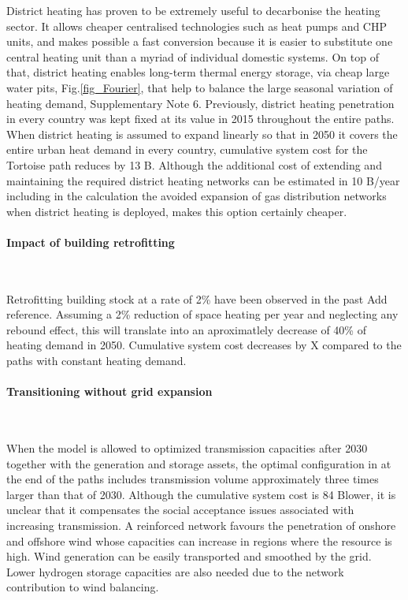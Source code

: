 \documentclass[5p]{elsarticle} %
\begin{document}
District heating has proven to be extremely useful to decarbonise the heating sector. It allows cheaper centralised technologies such as heat pumps and CHP units, and makes possible a fast conversion because it is easier to substitute one central heating unit than a myriad of individual domestic systems. On top of that, district heating enables long-term thermal energy storage, via cheap large water pits, Fig.\ref{fig_Fourier}, that help to balance the large seasonal variation of heating demand, Supplementary Note 6. Previously, district heating penetration in every country was kept fixed at its value in 2015 \cite{DH_penetration} throughout the entire paths. When district heating is assumed to expand linearly so that in 2050 it covers the entire urban heat demand in every country, cumulative system cost for the Tortoise path reduces by 13 B\EUR. Although the additional cost of extending and maintaining the required district heating networks can be estimated in 10 B\EUR/year \cite{Brown_2018} including in the calculation the avoided expansion of gas distribution networks when district heating is deployed, makes this option certainly cheaper. 

\paragraph{\textbf{Impact of building retrofitting}} \

Retrofitting building stock at a rate of 2\% have been observed in the past \textcolor[rgb]{1,0,0}{Add reference}. Assuming a 2\% reduction of space heating per year and neglecting any rebound effect, this will translate into an aproximatlely decrease of 40\% of heating demand in 2050. Cumulative system cost decreases by \textcolor[rgb]{1,0,0}{X} \EUR compared to the paths with constant heating demand.


\paragraph{\textbf{Transitioning without grid expansion}} \

When the model is allowed to optimized transmission capacities after 2030 together with the generation and storage assets, the optimal configuration in at the end of the paths includes transmission volume approximately three times larger than that of 2030.  Although the cumulative system cost is 84 B\EUR lower, it is unclear that it compensates the social acceptance issues associated with increasing transmission. A reinforced network favours the penetration of onshore and offshore wind whose capacities can increase in regions where the resource is high. Wind generation can be easily transported and smoothed by the grid. Lower hydrogen storage capacities are also needed due to the network contribution to wind balancing. 
\end{document}
